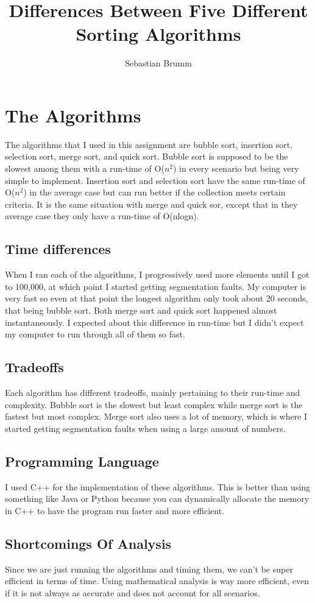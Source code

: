 \documentclass[11pt]{article} %
\title{Differences Between Five Different Sorting Algorithms}
\author{Sebastian Brumm}
\begin{document}
\maketitle

\section{The Algorithms}

The algorithms that I used in this assignment are bubble sort, insertion sort, selection sort, merge sort, and quick sort. Bubble sort is supposed to be the slowest among them with a run-time of O($n^2$) in every scenario but being very simple to implement. Insertion sort and selection sort have the same run-time of O($n^2$) in the average case but can run better if the collection meets certain criteria. It is the same situation with merge and quick sor, except that in they average case they only have a run-time of O(nlogn).

\subsection{Time differences}

When I ran each of the algorithms, I progressively used more elements until I got to 100,000, at which point I started getting segmentation faults. My computer is very fast so even at that point the longest algorithm only took about 20 seconds, that being bubble sort. Both merge sort and quick sort happened almost instantaneously. I expected about this difference in run-time but I didn't expect my computer to run through all of them so fast.

\subsection{Tradeoffs}

Each algorithm has different tradeoffs, mainly pertaining to their run-time and complexity. Bubble sort is the slowest but least complex while merge sort is the fastest but most complex. Merge sort also uses a lot of memory, which is where I started getting segmentation faults when using a large amount of numbers.

\subsection{Programming Language}

I used C++ for the implementation of these algorithms. This is better than using something like Java or Python because you can dynamically allocate the memory in C++ to have the program run faster and more efficient.

\subsection{Shortcomings Of Analysis}

Since we are just running the algorithms and timing them, we can't be super efficient in terms of time. Using mathematical analysis is way more efficient, even if it is not always as accurate and does not account for all scenarios.
\end{document}
